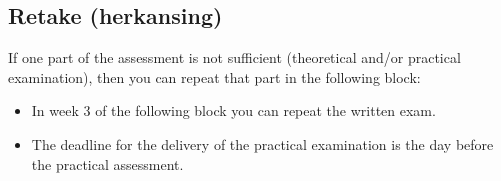 	\subsection{Retake (herkansing)}
	If one part of the assessment is not sufficient (theoretical and/or practical examination), then you can repeat that part in the following block:
	\begin{itemize}
	\item In week 3 of the following block you can repeat the written exam.
	\item The deadline for the delivery of the practical examination is the day before the practical assessment.
	\end{itemize}
	
